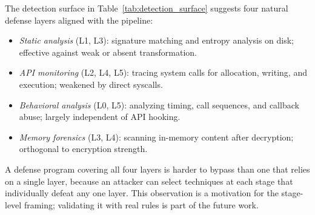 The detection surface in Table~\ref{tab:detection_surface} suggests four natural defense layers aligned with the pipeline:

\begin{itemize}[leftmargin=*, itemsep=1pt]
    \item \textit{Static analysis} (L1, L3): signature matching and entropy analysis on disk; effective against weak or absent transformation.
    \item \textit{API monitoring} (L2, L4, L5): tracing system calls for allocation, writing, and execution; weakened by direct syscalls.
    \item \textit{Behavioral analysis} (L0, L5): analyzing timing, call sequences, and callback abuse; largely independent of API hooking.
    \item \textit{Memory forensics} (L3, L4): scanning in-memory content after decryption; orthogonal to encryption strength.
\end{itemize}

A defense program covering all four layers is harder to bypass than one that relies on a single layer, because an attacker can select techniques at each stage that individually defeat any one layer.
This observation is a motivation for the stage-level framing; validating it with real rules is part of the future work.
